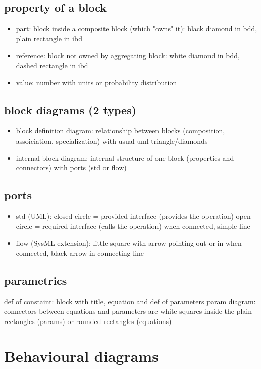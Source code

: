 \documentclass[11pt]{article}
\begin{document}
\subsection{property of a block}
\label{sec:orgc99eb05}
\begin{itemize}
\item part: block inside a composite block (which "owns" it): black diamond in
bdd, plain rectangle in ibd
\item reference: block not owned by aggregating block: white diamond in bdd,
dashed rectangle in ibd
\item value: number with units or probability distribution
\end{itemize}
\subsection{block diagrams (2 types)}
\label{sec:org60edbc3}
\begin{itemize}
\item block definition diagram: relationship between blocks (composition,
assoiciation, specialization) with usual uml triangle/diamonds
\item internal block diagram: internal structure of one block (properties and
connectors) with ports (std or flow)
\end{itemize}
\subsection{ports}
\label{sec:org9cb1e46}
\begin{itemize}
\item std (UML): 
closed circle = provided interface (provides the operation)
open circle = required interface (calls the operation)
when connected, simple line
\item flow (SysML extension):
little square with arrow pointing out or in
when connected, black arrow in connecting line
\end{itemize}
\subsection{parametrics}
\label{sec:org54fe164}
def of constaint: block with title, equation and def of parameters
param diagram: connectors between equations and parameters are white squares
inside the plain rectangles (params) or rounded rectangles (equations)
\section{Behavioural diagrams}
\label{sec:org254067d}
\end{document}
